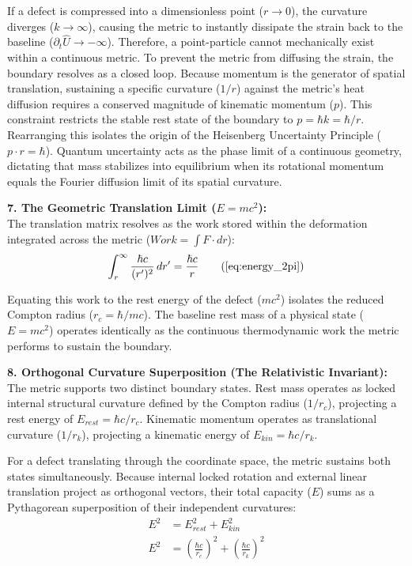 If a defect is compressed into a dimensionless point ($r \to 0$), the curvature diverges ($k \to \infty$), causing the metric to instantly dissipate the strain back to the baseline ($\partial_t \hat{U} \to -\infty$). Therefore, a point-particle cannot mechanically exist within a continuous metric. To prevent the metric from diffusing the strain, the boundary resolves as a closed loop. Because momentum is the generator of spatial translation, sustaining a specific curvature ($1/r$) against the metric's heat diffusion requires a conserved magnitude of kinematic momentum ($p$). This constraint restricts the stable rest state of the boundary to $p = \hbar k = \hbar/r$. Rearranging this isolates the origin of the Heisenberg Uncertainty Principle ($p \cdot r = \hbar$). Quantum uncertainty acts as the phase limit of a continuous geometry, dictating that mass stabilizes into equilibrium when its rotational momentum equals the Fourier diffusion limit of its spatial curvature.

\vspace{0.2 cm}

\textbf{7. The Geometric Translation Limit ($E = mc^2$):} \\
The translation matrix resolves as the work stored within the deformation integrated across the metric ($Work = \int F \cdot dr$):
\begin{equation}
    \int_r^\infty \frac{\hbar c}{(r')^2} \, dr' = \frac{\hbar c}{r} \tag{\ref{eq:energy_2pi}}
\end{equation}

Equating this work to the rest energy of the defect ($mc^2$) isolates the reduced Compton radius ($r_c = \hbar/mc$). The baseline rest mass of a physical state ($E=mc^2$) operates identically as the continuous thermodynamic work the metric performs to sustain the boundary.

\vspace{0.2 cm}


\textbf{8. Orthogonal Curvature Superposition (The Relativistic Invariant):} \\
The metric supports two distinct boundary states.  Rest mass operates as locked internal structural curvature defined by the Compton radius ($1/r_c$), projecting a rest energy of $E_{rest} = \hbar c / r_c$. Kinematic momentum operates as translational curvature ($1/r_k$), projecting a kinematic energy of $E_{kin} = \hbar c / r_k$.

For a defect translating through the coordinate space, the metric sustains both states simultaneously. Because internal locked rotation and external linear translation project as orthogonal vectors, their total capacity ($E$) sums as a Pythagorean superposition of their independent curvatures:
\begin{align}
    E^2 &= E_{rest}^2 + E_{kin}^2 \nonumber \\
    E^2 &= \left( \frac{\hbar c}{r_c} \right)^2 + \left( \frac{\hbar c}{r_k} \right)^2 
\end{align}

